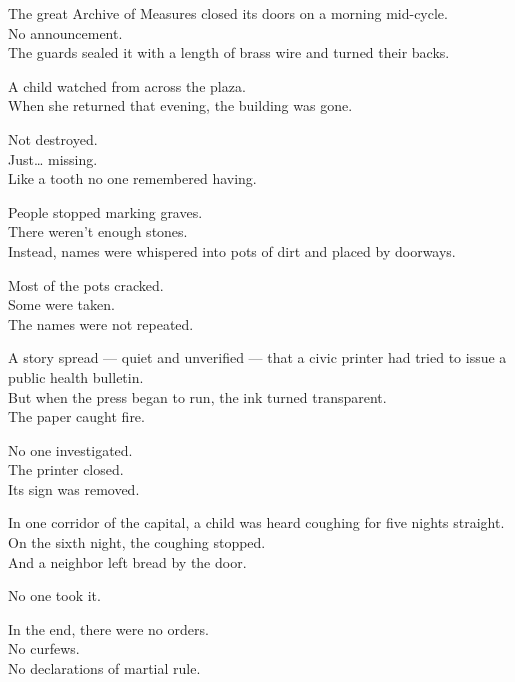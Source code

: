 \documentclass[12pt]{article}
\begin{document}
\vspace{1em}

The great Archive of Measures closed its doors on a morning mid-cycle.\\
No announcement.\\
The guards sealed it with a length of brass wire and turned their backs.

A child watched from across the plaza.\\
When she returned that evening, the building was gone.

Not destroyed.\\
Just… missing.\\
Like a tooth no one remembered having.

\vspace{1em}

People stopped marking graves.\\
There weren’t enough stones.\\
Instead, names were whispered into pots of dirt and placed by doorways.

Most of the pots cracked.\\
Some were taken.\\
The names were not repeated.

\vspace{1em}

A story spread — quiet and unverified — that a civic printer had tried to issue a public health bulletin.\\
But when the press began to run, the ink turned transparent.\\
The paper caught fire.

No one investigated.\\
The printer closed.\\
Its sign was removed.

\vspace{1em}

In one corridor of the capital, a child was heard coughing for five nights straight.\\
On the sixth night, the coughing stopped.\\
And a neighbor left bread by the door.

No one took it.

\vspace{1em}

In the end, there were no orders.\\
No curfews.\\
No declarations of martial rule.
\end{document}
